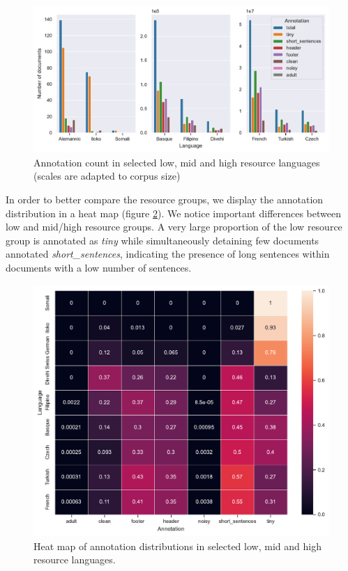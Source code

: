 \begin{figure}[!ht]
    \begin{center}
        \includegraphics[scale=0.7]{static/media/oscar/towards/annot_count.pdf}
        \caption{Annotation count in selected low, mid and high resource languages (scales are adapted to corpus size)}
        \label{annot-count}
    \end{center}
\end{figure}

In order to better compare the resource groups, we display the annotation distribution in a heat map (figure \ref{annot-heatmap}).
We notice important differences between low and mid/high resource groups.
A very large proportion of the low resource group is annotated as \textit{tiny} while simultaneously detaining few documents annotated \textit{short\_sentences}, indicating the presence of long sentences within documents with a low number of sentences.

\begin{figure}[!ht]
    \begin{center}
        \includegraphics[scale=0.6]{static/media/oscar/towards/annot_heatmap}
        \caption{Heat map of annotation distributions in selected low, mid and high resource languages.}
        \label{annot-heatmap}
    \end{center}
\end{figure}

